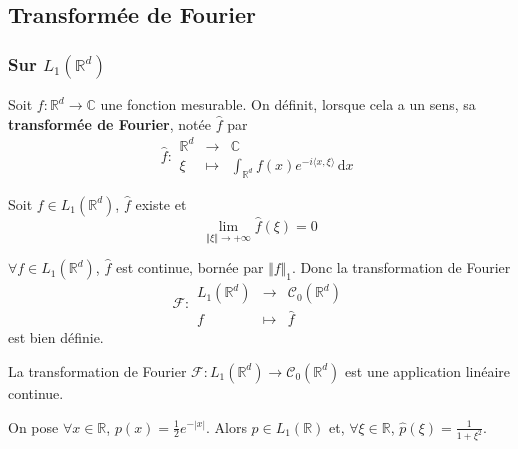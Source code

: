   \subsection{Transformée de Fourier}

  \subsubsection{Sur \texorpdfstring{$L_1(\mathbb{R}^d)$}{Rᵈ}}


  \begin{definition}
    Soit $f : \mathbb{R}^d \rightarrow \mathbb{C}$ une fonction mesurable. On définit, lorsque cela a un sens, sa \textbf{transformée de Fourier}, notée $\widehat{f}$ par
    \[
    \widehat{f} :
    \begin{array}{ccc}
      \mathbb{R}^d &\rightarrow& \mathbb{C} \\
      \xi &\mapsto& \int_{\mathbb{R}^d} f(x) e^{-i\langle x, \xi \rangle} \, \mathrm{d}x
    \end{array}
    \]
  \end{definition}

  \begin{lemma}
    Soit $f \in L_1(\mathbb{R}^d)$, $\widehat{f}$ existe et
    \[ \lim_{\Vert \xi \Vert \rightarrow +\infty} \widehat{f}(\xi) = 0 \]
  \end{lemma}

  \begin{theorem}
    $\forall f \in L_1(\mathbb{R}^d)$, $\widehat{f}$ est continue, bornée par $\Vert f \Vert_1$. Donc la transformation de Fourier
    \[
    \mathcal{F} :
    \begin{array}{ccc}
      L_1(\mathbb{R}^d) &\rightarrow& \mathcal{C}_0(\mathbb{R}^d) \\
      f &\mapsto& \widehat{f}
    \end{array}
    \]
    est bien définie.
  \end{theorem}

  \begin{corollary}
    La transformation de Fourier $\mathcal{F} : L_1(\mathbb{R}^d) \rightarrow \mathcal{C}_0(\mathbb{R}^d)$ est une application linéaire continue.
  \end{corollary}

  \begin{example}
    On pose $\forall x \in \mathbb{R}$, $p(x) = \frac{1}{2} e^{-|x|}$. Alors $p \in L_1(\mathbb{R})$ et, $\forall \xi \in \mathbb{R}$, $\widehat{p}(\xi) = \frac{1}{1+\xi^2}$.
  \end{example}

